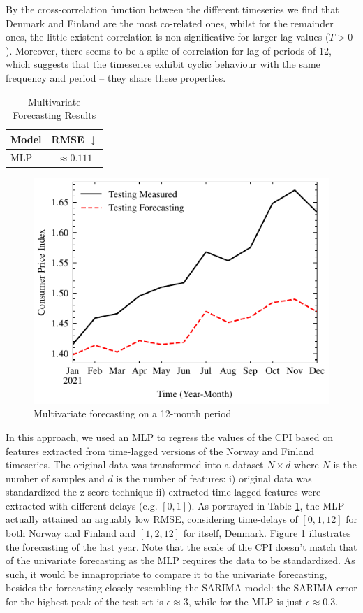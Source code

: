 \documentclass[conference]{IEEEtran}
\begin{document}
By the cross-correlation function between the different timeseries we find that Denmark and Finland are the most co-related ones, whilst for the remainder ones, the little existent correlation is non-significative for larger lag values ($T>0$). Moreover, there seems to be a spike of correlation for lag of periods of $12$, which suggests that the timeseries exhibit cyclic behaviour with the same frequency and period -- they share these properties.

\begin{table}[btp]
    \caption{Multivariate Forecasting Results}
    \centering
    \begin{tabular}{l|c}
        Model & RMSE $\downarrow$ \\
        \hline
        MLP & $\approx 0.111$
    \end{tabular}
    \label{tab:forecasting_multi}
\end{table}

\begin{figure}[H]
    \centering
    \includegraphics{../figs/multi_forecast.pdf}
    \caption{Multivariate forecasting on a 12-month period}
    \label{fig:forecasting_multi}
\end{figure}

In this approach, we used an MLP to regress the values of the CPI based on features extracted from time-lagged versions of the Norway and Finland timeseries. The original data was transformed into a dataset $N\times d$ where $N$ is the number of samples and $d$ is the number of features: i) original data was standardized the z-score technique ii) extracted time-lagged features were extracted with different delays (e.g. $[0,1]$). As portrayed in Table \ref{tab:forecasting_multi}, the MLP actually attained an arguably low RMSE, considering time-delays of $[0,1,12]$ for both Norway and Finland and $[1,2,12]$ for itself, Denmark. Figure \ref{fig:forecasting_multi} illustrates the forecasting of the last year. Note that the scale of the CPI doesn't match that of the univariate forecasting as the MLP requires the data to be standardized. As such, it would be innapropriate to compare it to the univariate forecasting, besides the forecasting closely resembling the SARIMA model: the SARIMA error for the highest peak of the test set is $\epsilon\approx 3$, while for the MLP is just $\epsilon\approx 0.3$.
\end{document}
